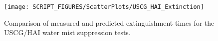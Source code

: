 \begin{figure}[h!]
\begin{center}
\texttt{[image: SCRIPT\_FIGURES/ScatterPlots/USCG\_HAI\_Extinction]}
\caption[Extinguishment times for the USCG/HAI water mist suppression tests]{Comparison of measured and predicted extinguishment times for the USCG/HAI water mist suppression tests.}
\label{USCG_Scatter}
\end{center}
\end{figure}
